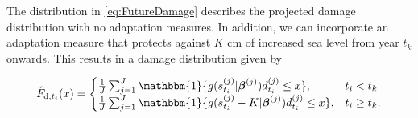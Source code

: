 \documentclass[draft,linenumbers]{agujournal}
\begin{document}
The distribution in \eqref{eq:FutureDamage} describes the projected damage distribution with no adaptation measures. In addition, we can incorporate an adaptation measure that protects against $K$ cm of increased sea level from year $t_k$ onwards. This results in a damage distribution given by
\begin{linenomath*}
  \[
  \hat{F}_{\textup{d}, t_i} (x) =
    \begin{cases}
      \frac{1}{J} \sum_{j=1}^J \mathbbm{1}\{g(s_{t_i}^{(j)}| \boldsymbol \beta^{(j)}) d_{t_i}^{(j)} \leq x \}, & t_i < t_k \\
      \frac{1}{J} \sum_{j=1}^J \mathbbm{1}\{g(s_{t_i}^{(j)} - K| \boldsymbol \beta^{(j)}) d_{t_i}^{(j)} \leq x \}, & t_i \geq t_k. \\
    \end{cases}
  \]
\end{linenomath*}

\end{document}
